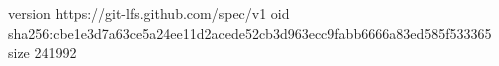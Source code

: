 version https://git-lfs.github.com/spec/v1
oid sha256:cbe1e3d7a63ce5a24ee11d2acede52cb3d963ecc9fabb6666a83ed585f533365
size 241992
